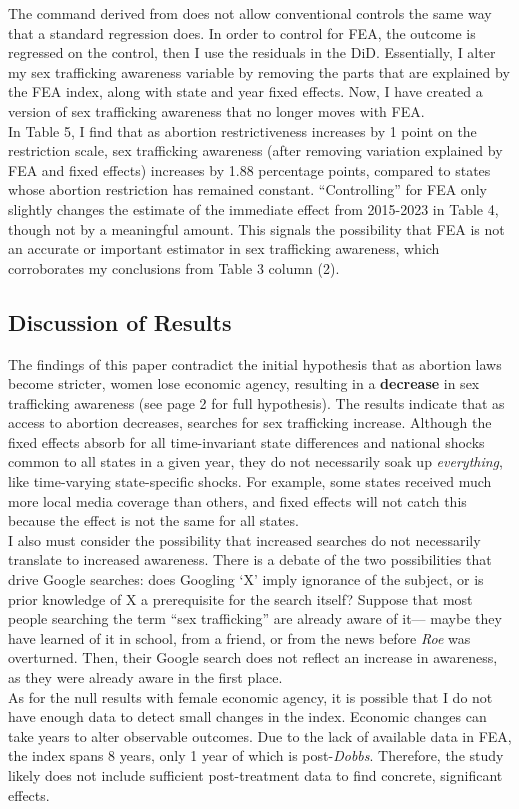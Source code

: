 The command derived from \cite{diff2} does not allow conventional controls the same way that a standard regression does. In order to control for FEA, the outcome is regressed on the control, then I use the residuals in the \cite{diff2} DiD. Essentially, I alter my sex trafficking awareness variable by removing the parts that are explained by the FEA index, along with state and year fixed effects. Now, I have created a version of sex trafficking awareness that no longer moves with FEA. \\
\indent In Table 5, I find that as abortion restrictiveness increases by 1 point on the restriction scale, sex trafficking awareness (after removing variation explained by FEA and fixed effects) increases by 1.88 percentage points, compared to states whose abortion restriction has remained constant. ``Controlling'' for FEA only slightly changes the estimate of the immediate effect from 2015-2023 in Table 4, though not by a meaningful amount. This signals the possibility that FEA is not an accurate or important estimator in sex trafficking awareness, which corroborates my conclusions from Table 3 column (2).

\subsection{Discussion of Results}
The findings of this paper contradict the initial hypothesis that as abortion laws become stricter, women lose economic agency, resulting in a \textbf{decrease} in sex trafficking awareness (see page 2 for full hypothesis). The results indicate that as access to abortion decreases, searches for sex trafficking increase. Although the fixed effects absorb for all time-invariant state differences and national shocks common to all states in a given year, they do not necessarily soak up \textit{everything}, like time-varying state-specific shocks. For example, some states received much more local media coverage than others, and fixed effects will not catch this because the effect is not the same for all states. \\
\indent I also must consider the possibility that increased searches do not necessarily translate to increased awareness. There is a debate of the two possibilities that drive Google searches: does Googling `X' imply ignorance of the subject, or is prior knowledge of X a prerequisite for the search itself? Suppose that most people searching the term ``sex trafficking'' are already aware of it— maybe they have learned of it in school, from a friend, or from the news before \textit{Roe} was overturned. Then, their Google search does not reflect an increase in awareness, as they were already aware in the first place. \\
\indent As for the null results with female economic agency, it is possible that I do not have enough data to detect small changes in the index. 
Economic changes can take years to alter observable outcomes. Due to the lack of available data in FEA, the index spans 8 years, only 1 year of which is post-\textit{Dobbs}. Therefore, the study likely does not include sufficient post-treatment data to find concrete, significant effects.  
